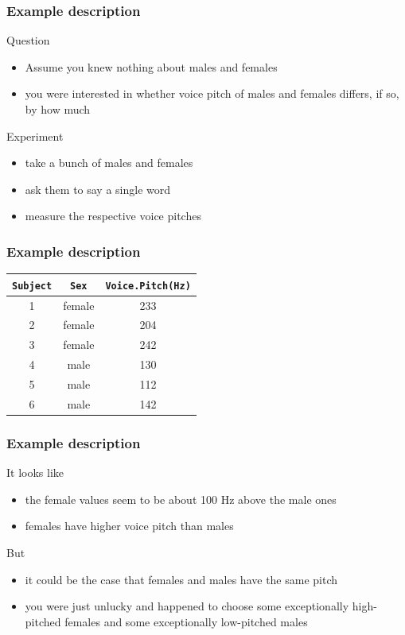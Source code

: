 \documentclass[10p]{beamer}\usepackage[]{graphicx}\usepackage[]{color}
\begin{document}
\begin{frame}
\frametitle{Example description}
Question
\begin{itemize}
\item Assume you knew nothing about males and females
\item you were interested in whether \alert{voice pitch} of males and females differs, if so, by how much
\end{itemize}

\vspace{9pt}
Experiment
\begin{itemize}
\item take a bunch of males and females
\item ask them to say a single word
\item measure the respective voice pitches
\end{itemize}

\end{frame}

\begin{frame}
\frametitle{Example description}

\begin{center}
\begin{tabular}{ccc}
\toprule
\texttt{Subject} & \texttt{Sex} & \texttt{Voice.Pitch(Hz)} \\
\midrule
1 & female & 233 \\
2 & female & 204 \\
3 & female & 242 \\
4 & male & 130 \\
5 & male & 112 \\
6 & male & 142 \\
\bottomrule
\end{tabular}
\end{center}

\end{frame}

\begin{frame}
\frametitle{Example description}
It looks like
\begin{itemize}
\item the female values seem to be about 100 Hz above the male ones
\item females have higher voice pitch than males
\end{itemize}

\vspace{9pt}
But
\begin{itemize}
\item it could be the case that females and males have the same pitch
\item you were just unlucky and happened to choose some exceptionally high-pitched females and some exceptionally low-pitched males
\end{itemize}
\end{frame}
\end{document}
